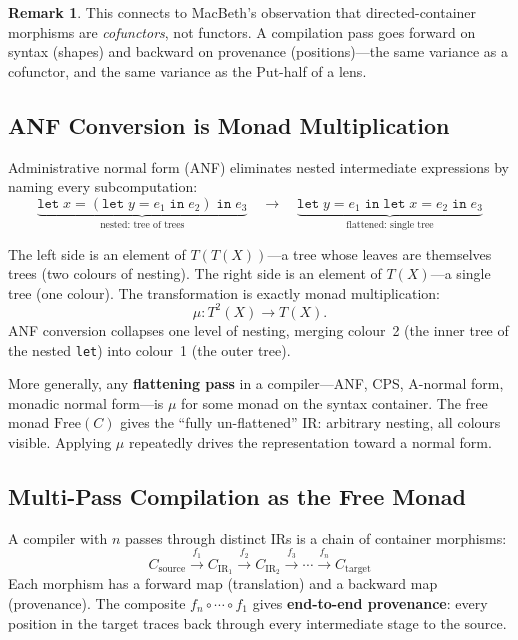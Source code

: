 \documentclass[11pt,a4paper]{article}
\theoremstyle{definition}
\newtheorem{remark}[definition]{Remark}
\theoremstyle{plain}
\newcommand{\Free}{\mathrm{Free}}
\begin{document}
\begin{remark}
This connects to MacBeth's observation that directed-container morphisms
are \emph{cofunctors}, not functors. A compilation pass goes forward on
syntax (shapes) and backward on provenance (positions)---the same
variance as a cofunctor, and the same variance as the Put-half of a lens.
\end{remark}

\subsection{ANF Conversion is Monad Multiplication}

Administrative normal form (ANF) eliminates nested intermediate
expressions by naming every subcomputation:
\[
\underbrace{\texttt{let}\; x = (\texttt{let}\; y = e_1 \;\texttt{in}\; e_2)
  \;\texttt{in}\; e_3}_{\text{nested: tree of trees}}
\quad\longrightarrow\quad
\underbrace{\texttt{let}\; y = e_1 \;\texttt{in}\;
  \texttt{let}\; x = e_2 \;\texttt{in}\; e_3}_{\text{flattened: single tree}}
\]

The left side is an element of $T(T(X))$---a tree whose leaves are
themselves trees (two colours of nesting). The right side is an element of
$T(X)$---a single tree (one colour). The transformation is exactly monad
multiplication:
\[
\mu : T^2(X) \longrightarrow T(X).
\]
ANF conversion collapses one level of nesting, merging colour~2 (the inner
tree of the nested \texttt{let}) into colour~1 (the outer tree).

More generally, any \textbf{flattening pass} in a compiler---ANF, CPS,
A-normal form, monadic normal form---is $\mu$ for some monad on the syntax
container. The free monad $\Free(C)$ gives the ``fully un-flattened'' IR:
arbitrary nesting, all colours visible. Applying $\mu$ repeatedly drives
the representation toward a normal form.

\subsection{Multi-Pass Compilation as the Free Monad}

A compiler with $n$ passes through distinct IRs is a chain of container
morphisms:
\[
C_{\text{source}} \xrightarrow{f_1} C_{\text{IR}_1}
  \xrightarrow{f_2} C_{\text{IR}_2}
  \xrightarrow{f_3} \cdots
  \xrightarrow{f_n} C_{\text{target}}
\]
Each morphism has a forward map (translation) and a backward map
(provenance). The composite $f_n \circ \cdots \circ f_1$ gives
\textbf{end-to-end provenance}: every position in the target traces
back through every intermediate stage to the source.
\end{document}
